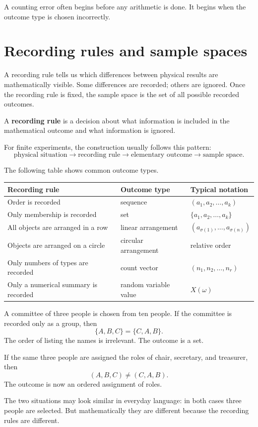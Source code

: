 \begin{remarkbox}
A counting error often begins before any arithmetic is done. It begins when the outcome type is chosen incorrectly.
\end{remarkbox}

\section{Recording rules and sample spaces}

A recording rule tells us which differences between physical results are mathematically visible. Some differences are recorded; others are ignored. Once the recording rule is fixed, the sample space is the set of all possible recorded outcomes.

\begin{definitionbox}
A \textbf{recording rule} is a decision about what information is included in the mathematical outcome and what information is ignored.
\end{definitionbox}

For finite experiments, the construction usually follows this pattern:
\[
\text{physical situation}
\longrightarrow
\text{recording rule}
\longrightarrow
\text{elementary outcome}
\longrightarrow
\text{sample space}.
\]

The following table shows common outcome types.

\begin{center}
\begin{tabular}{lll}
\toprule
Recording rule & Outcome type & Typical notation \\
\midrule
Order is recorded & sequence & \((a_1,a_2,\ldots,a_k)\) \\
Only membership is recorded & set & \(\{a_1,a_2,\ldots,a_k\}\) \\
All objects are arranged in a row & linear arrangement & \((a_{\sigma(1)},\ldots,a_{\sigma(n)})\) \\
Objects are arranged on a circle & circular arrangement & relative order \\
Only numbers of types are recorded & count vector & \((n_1,n_2,\ldots,n_r)\) \\
Only a numerical summary is recorded & random variable value & \(X(\omega)\) \\
\bottomrule
\end{tabular}
\end{center}

\begin{examplebox}
A committee of three people is chosen from ten people. If the committee is recorded only as a group, then
\[
\{A,B,C\}=\{C,A,B\}.
\]
The order of listing the names is irrelevant. The outcome is a set.

If the same three people are assigned the roles of chair, secretary, and treasurer, then
\[
(A,B,C)\neq (C,A,B).
\]
The outcome is now an ordered assignment of roles.
\end{examplebox}

The two situations may look similar in everyday language: in both cases three people are selected. But mathematically they are different because the recording rules are different.
